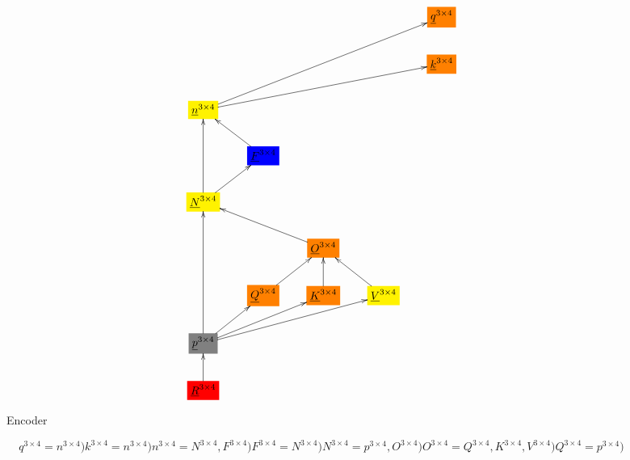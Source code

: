 \documentclass[12pt]{article}
\begin{document}
\begin{figure}[h!]\centering
$$\xymatrix{
&&&&*+[F*:orange]{\underline{q}^{3\times  4}}
\\
&&&&*+[F*:orange]{\underline{k}^{3\times  4}}
\\
*+[F*:yellow]{\underline{n}^{3\times  4}}\ar[uurrrr]\ar[urrrr]&&&&
\\
&*+[F*:blue]{\underline{F}^{3\times  4}}\ar[ul]&&&
\\
*+[F*:yellow]{\underline{N}^{3\times  4}}\ar[uu]\ar[ur]&&&&
\\
&&*+[F*:orange]{\underline{O}^{3\times  4}}\ar[ull]&&
\\
&*+[F*:orange]{\underline{Q}^{3\times  4}}\ar[ur]&*+[F*:orange]{\underline{K}^{3\times  4}}\ar[u]&*+[F*:yellow]{\underline{V}^{3\times  4}}\ar[ul]&
\\
*+[F*:gray]{\underline{p}^{3\times  4}}\ar[uuu]\ar[ur]\ar[urr]\ar[urrr]&&&&
\\
*+[F*:red]{\underline{R}^{3\times  4}}\ar[u]&&&&
}$$
\caption{Encoder}
\label{fig-texnn-for-encoder}
\end{figure}\begin{subequations}
\begin{equation}
q^{3\times  4} = n^{3\times  4})
\label{eq-q-fun-encoder}
\end{equation}

\begin{equation}
k^{3\times  4} = n^{3\times  4})
\label{eq-k-fun-encoder}
\end{equation}

\begin{equation}
n^{3\times  4} = N^{3\times  4},F^{3\times  4})
\label{eq-n-fun-encoder}
\end{equation}

\begin{equation}
F^{3\times  4} = N^{3\times  4})
\label{eq-F-fun-encoder}
\end{equation}

\begin{equation}
N^{3\times  4} = p^{3\times  4},O^{3\times  4})
\label{eq-N-fun-encoder}
\end{equation}

\begin{equation}
O^{3\times  4} = Q^{3\times  4},K^{3\times  4},V^{3\times  4})
\label{eq-O-fun-encoder}
\end{equation}

\begin{equation}
Q^{3\times  4} = p^{3\times  4})
\label{eq-Q-fun-encoder}
\end{equation}


\end{subequations}
\end{document}
